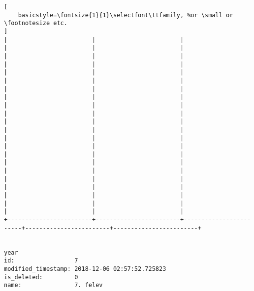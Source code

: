 \begin{lstlisting}[
    basicstyle=\fontsize{1}{1}\selectfont\ttfamily, %or \small or \footnotesize etc.
]
|                        |                        |                        |                        |                        | 
|                        |                        |                        |                        |                        | 
|                        |                        |                        |                        |                        | 
|                        |                        |                        |                        |                        | 
|                        |                        |                        |                        |                        | 
|                        |                        |                        |                        |                        | 
|                        |                        |                        |                        |                        | 
|                        |                        |                        |                        |                        | 
|                        |                        |                        |                        |                        | 
|                        |                        |                        |                        |                        | 
|                        |                        |                        |                        |                        | 
+------------------------+------------------------+------------------------+------------------------+------------------------+


year                
id:                 7
modified_timestamp: 2018-12-06 02:57:52.725823
is_deleted:         0
name:               7. felev


\end{lstlisting}

